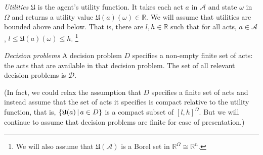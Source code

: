 \documentclass[a4paper]{article}
\newcommand\A{\mathcal{A}}
\renewcommand\P{\mathbb{P}} %
\newcommand\EU{\mathrm{EU}}
\newcommand\REU{\mathrm{REU}}
\newcommand\EAd{\mathrm{EAd}}
\newcommand\U{\mathfrak{U}} %
\newcommand\Maximin{\Gamma}
\newcommand{\D}{\mathcal{D}}
\renewcommand\S{\mathcal{S}}
\renewcommand\c{\mathsf{c}} %
\newcommand{\IP}{\P}
\renewcommand{\Re}{\mathbb{R}}
\newcommand{\todoold}[2][]{\todo[backgroundcolor=white,bordercolor=orange!10,linecolor=gray!10, #1,caption={},textcolor=gray]{Pre-rev: #2}}
\newcommand\SetDelimiter[1][]{
	\nonscript\,#1\vert \allowbreak \nonscript\,\mathopen{}}
\providecommand\given{\SetDelimiter}
\renewcommand{\emptyset}{\varnothing}
\renewcommand{\leq}{\leqslant}
\newenvironment{CCM rewritten}
{\begingroup\color{blue}} %
{\endgroup}              %
\begin{document}
 \emph{Utilities } $\U$ is the agent's utility function. It takes each act $a$ in $\A$ and state $\omega$ in $\Omega$ and returns a utility value $\U(a)(\omega)\in\Re$. We will assume that utilities are bounded above and below. That is, there are $l,h\in\Re$ such that for all acts, $a\in\A$, $l\leq \U(a)(\omega)\leq h$.%
 \footnote{We will also assume that $\U(\A)$ is a Borel set in $\Re^\Omega\cong\Re^n$.}%

\emph{Decision problems } A decision problem $D$ specifies a non-empty finite set of acts: the acts that are available in that decision problem. The set of all relevant decision problems is $\D$. %

(In fact, we could relax the assumption that $D$ specifies a finite set of acts and instead assume that the set of acts it specifies is compact relative to the utility function, that is, $\{\U(a)\given a \in D\}$ is a compact subset of $[l,h]^\Omega$. But we will continue to assume that decision problems are finite for ease of presentation.)


\end{document}
